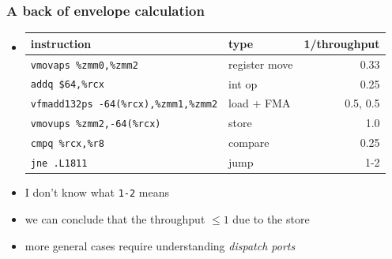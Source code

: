 \documentclass[12pt,dvipdfmx]{beamer}
\newcommand{\aka}[1]{{\color{red}#1}}
\begin{document}

\begin{frame}
\frametitle{A back of envelope calculation}

\begin{itemize}
\item []
{\scriptsize
  \begin{tabular}{|l|l|r|}\hline
    instruction & type & 1/throughput \\\hline
{\tt vmovaps \%zmm0,\%zmm2}  & register move & {\tiny 0.33} \\
{\tt addq \$64,\%rcx}     & int op & {\tiny 0.25} \\
{\tt vfmadd132ps -64(\%rcx),\%zmm1,\%zmm2} & load + FMA & 0.5, 0.5 \\
{\tt vmovups \%zmm2,-64(\%rcx)} & store & \aka{1.0} \\
{\tt cmpq \%rcx,\%r8} & compare & 0.25 \\
{\tt jne .L1811} & jump & 1-2 \\
\hline
  \end{tabular}}
\item I don't know what {\tt 1-2} means
\item we can conclude that the throughput $\leq 1$ due to the store

\item more general cases require understanding
  {\it dispatch ports}
\end{itemize}
\end{frame}
\end{document}
